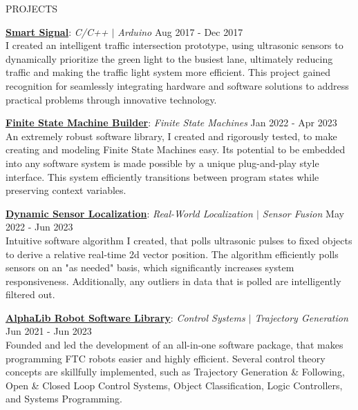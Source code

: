\documentclass{resume} %
\begin{document}
\begin{rSection}{PROJECTS}
\vspace{-1.25em}
\item{\underline{\textbf{Smart Signal}}}: \textit{C/C++ $\vert$ Arduino} \hfill {Aug 2017 - Dec 2017} \vspace{0.25em} \\
{I created an intelligent traffic intersection prototype, using ultrasonic sensors to dynamically prioritize the green light to the busiest lane, ultimately reducing traffic and making the traffic light system more efficient. This project gained recognition for seamlessly integrating hardware and software solutions to address practical problems through innovative technology.}

\item{\underline{\textbf{Finite State Machine Builder}}}: \textit{Finite State Machines} \hfill {Jan 2022 - Apr 2023} \vspace{0.25em} \\
{An extremely robust software library, I created and rigorously tested, to make creating and modeling Finite State Machines easy. Its potential to be embedded into any software system is made possible by a unique plug-and-play style interface. This system efficiently transitions between program states while preserving context variables.}

\item{\underline{\textbf{Dynamic Sensor Localization}}}: \textit{Real-World Localization $\vert$ Sensor Fusion} \hfill {May 2022 - Jun 2023} \vspace{0.25em}\\
{Intuitive software algorithm I created, that polls ultrasonic pulses to fixed objects to derive a relative real-time 2d vector position. The algorithm efficiently polls sensors on an "as needed" basis, which significantly increases system responsiveness. Additionally, any outliers in data that is polled are intelligently filtered out.}

\item{\underline{\textbf{AlphaLib Robot Software Library}}}: \textit{Control Systems $\vert$ Trajectory Generation} \hfill {Jun 2021 - Jun 2023} \vspace{0.25em}\\
{Founded and led the development of an all-in-one software package, that makes programming FTC robots easier and highly efficient. Several control theory concepts are skillfully implemented, such as Trajectory Generation \& Following, Open \& Closed Loop Control Systems, Object Classification, Logic Controllers, and Systems Programming.}
\end{rSection} 
\end{document}
